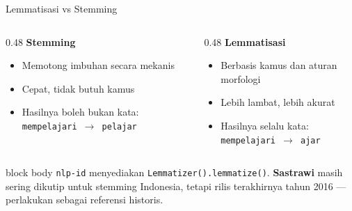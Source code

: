 \documentclass[aspectratio=169,t]{beamer}
\begin{document}
\begin{frame}{Lemmatisasi vs Stemming}
  \begin{columns}[T]
    \begin{column}{0.48\textwidth}
      \textcolor{nvorange}{\textbf{Stemming}}
      \begin{itemize}
        \footnotesize
        \item Memotong imbuhan secara mekanis
        \item Cepat, tidak butuh kamus
        \item Hasilnya boleh bukan kata: \texttt{mempelajari $\to$ pelajar}
      \end{itemize}
    \end{column}
    \begin{column}{0.48\textwidth}
      \textcolor{nvgreen}{\textbf{Lemmatisasi}}
      \begin{itemize}
        \footnotesize
        \item Berbasis kamus dan aturan morfologi
        \item Lebih lambat, lebih akurat
        \item Hasilnya selalu kata: \texttt{mempelajari $\to$ ajar}
      \end{itemize}
    \end{column}
  \end{columns}
  \vspace{0.8em}
  \begin{beamercolorbox}[rounded=true,shadow=false,sep=6pt]{block body}
    \small\color{white}
    \texttt{nlp-id} menyediakan \texttt{Lemmatizer().lemmatize()}.
    \textbf{Sastrawi} masih sering dikutip untuk stemming Indonesia, tetapi
    rilis terakhirnya tahun 2016 --- perlakukan sebagai referensi historis.
  \end{beamercolorbox}
\end{frame}
\end{document}
